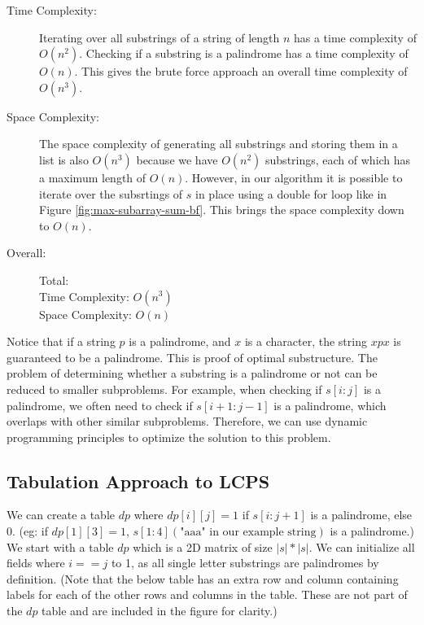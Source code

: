\begin{description}
    \item[Time Complexity:]
        Iterating over all substrings of a string of length $n$ has a time complexity of $O(n^2)$.
        Checking if a substring is a palindrome has a time complexity of $O(n)$.
        This gives the brute force approach an overall time complexity of $O(n^3)$.
        
    \item[Space Complexity:] 
        The space complexity of generating all substrings and storing them in a list is also $O(n^3)$
        because we have $O(n^2)$ substrings, each of which has a maximum length of $O(n)$.
        However, in our algorithm it is possible to iterate over the subsrtings of $s$ in place using a double for loop
        like in Figure \ref{fig:max-subarray-sum-bf}. This brings the space complexity down to $O(n)$.
        
    \item[Overall:] Total:\\
        Time Complexity: $O(n^3)$\\
        Space Complexity: $O(n)$
    
\end{description}
Notice that if a string $p$ is a palindrome, and $x$ is a character, the string $xpx$ is guaranteed to be a palindrome.
This is proof of optimal substructure.
The problem of determining whether a substring is a palindrome or not can be reduced to smaller subproblems.
For example, when checking if $s[i:j]$ is a palindrome, we often need to check if $s[i+1:j-1]$ is a palindrome,
which overlaps with other similar subproblems.
Therefore, we can use dynamic programming principles to optimize the solution to this problem.
\subsection{Tabulation Approach to LCPS}
We can create a table $dp$ where $dp[i][j] = 1$ if $s[i:j+1]$ is a palindrome, else 0. (eg: if $dp[1][3] = 1$, $s[1:4] (\text{"aaa" in our example string})$ is a palindrome.)
We start with a table $dp$ which is a 2D matrix of size $|s| * |s|$.
We can initialize all fields where $i == j$ to 1, as all single letter substrings are palindromes by definition. (Note that the below table has an extra row and column containing labels for each of the other rows and columns in the table. These are not part of the $dp$ table and are included in the figure for clarity.)

